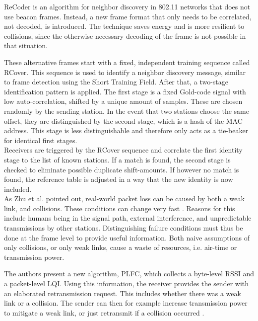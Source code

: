 ReCoder \cite{meng2015} is an algorithm for neighbor discovery in 802.11 networks that does not use beacon frames. Instead, a new frame format that only needs to be correlated, not decoded, is introduced. The technique saves energy and is more resilient to collisions, since the otherwise necessary decoding of the frame is not possible in that situation.

These alternative frames start with a fixed, independent training sequence called RCover. This sequence is used to identify a neighbor discovery message, similar to frame detection using the Short Training Field. After that, a two-stage identification pattern is applied. The first stage is a fixed Gold-code signal with low auto-correlation, shifted by a unique amount of samples. These are chosen randomly by the sending station. In the event that two stations choose the same offset, they are distinguished by the second stage, which is a hash of the \gls{MAC} address. This stage is less distinguishable and therefore only acts as a tie-beaker for identical first stages.\\

Receivers are triggered by the RCover sequence and correlate the first identity stage to the list of known stations. If a match is found, the second stage is checked to eliminate possible duplicate shift-amounts. If however no match is found, the reference table is adjusted in a way that the new identity is now included.\\

As Zhu et al. pointed out, real-world packet loss can be caused by both a weak link, and collisions. These conditions can change very fast \cite{zhu2015}. Reasons for this include humans being in the signal path, external interference, and unpredictable transmissions by other stations. Distinguishing failure conditions must thus be done at the frame level to provide useful information. Both naive assumptions of only collisions, or only weak links, cause a waste of resources, i.e. air-time or transmission power.

The authors present a new algorithm, \gls{PLFC}, which collects a byte-level \gls{RSSI} and a packet-level \gls{LQI}. Using this information, the receiver provides the sender with an elaborated retransmission request. This includes whether there was a weak link or a collision. The sender can then for example increase transmission power to mitigate a weak link, or just retransmit if a collision occurred \cite{zhu2015}.\\

